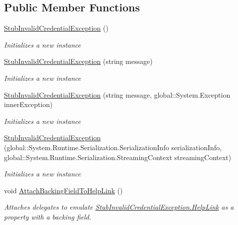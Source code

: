 \subsection*{Public Member Functions}
\begin{DoxyCompactItemize}
\item 
\hyperlink{class_system_1_1_security_1_1_authentication_1_1_fakes_1_1_stub_invalid_credential_exception_abc24ba70c6d251ecb46a379bd7ba6472}{Stub\-Invalid\-Credential\-Exception} ()
\begin{DoxyCompactList}\small\item\em Initializes a new instance\end{DoxyCompactList}\item 
\hyperlink{class_system_1_1_security_1_1_authentication_1_1_fakes_1_1_stub_invalid_credential_exception_a4cb5d91ce27b417fd8cd37b787f5026a}{Stub\-Invalid\-Credential\-Exception} (string message)
\begin{DoxyCompactList}\small\item\em Initializes a new instance\end{DoxyCompactList}\item 
\hyperlink{class_system_1_1_security_1_1_authentication_1_1_fakes_1_1_stub_invalid_credential_exception_a2ce68a5042bd0b29768f43a3cd13fd91}{Stub\-Invalid\-Credential\-Exception} (string message, global\-::\-System.\-Exception inner\-Exception)
\begin{DoxyCompactList}\small\item\em Initializes a new instance\end{DoxyCompactList}\item 
\hyperlink{class_system_1_1_security_1_1_authentication_1_1_fakes_1_1_stub_invalid_credential_exception_aa64399470f035049103eac1c7b2c13e8}{Stub\-Invalid\-Credential\-Exception} (global\-::\-System.\-Runtime.\-Serialization.\-Serialization\-Info serialization\-Info, global\-::\-System.\-Runtime.\-Serialization.\-Streaming\-Context streaming\-Context)
\begin{DoxyCompactList}\small\item\em Initializes a new instance\end{DoxyCompactList}\item 
void \hyperlink{class_system_1_1_security_1_1_authentication_1_1_fakes_1_1_stub_invalid_credential_exception_a6b3926bc67d316299fd7fd006f5b9029}{Attach\-Backing\-Field\-To\-Help\-Link} ()
\begin{DoxyCompactList}\small\item\em Attaches delegates to emulate \hyperlink{class_system_1_1_security_1_1_authentication_1_1_fakes_1_1_stub_invalid_credential_exception_a138dc0f03cbadf09704d4f7aee2df470}{Stub\-Invalid\-Credential\-Exception.\-Help\-Link} as a property with a backing field.\end{DoxyCompactList}\item 

\end{DoxyCompactItemize}
